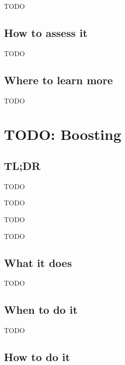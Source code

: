 \documentclass[
]{book}
\providecommand{\tightlist}{%
  \setlength{\itemsep}{0pt}\setlength{\parskip}{0pt}}
\begin{document}
TODO

\hypertarget{how-to-assess-it-16}{%
\section{How to assess it}\label{how-to-assess-it-16}}

TODO

\hypertarget{where-to-learn-more-16}{%
\section{Where to learn more}\label{where-to-learn-more-16}}

TODO

\hypertarget{boosting}{%
\chapter{TODO: Boosting}\label{boosting}}

\hypertarget{tldr-17}{%
\section{TL;DR}\label{tldr-17}}

\begin{description}
\tightlist
\item[What it does]
TODO
\item[When to do it]
TODO
\item[How to do it]
TODO
\item[How to assess it]
TODO
\end{description}

\hypertarget{what-it-does-17}{%
\section{What it does}\label{what-it-does-17}}

TODO

\hypertarget{when-to-do-it-17}{%
\section{When to do it}\label{when-to-do-it-17}}

TODO

\hypertarget{how-to-do-it-17}{%
\section{How to do it}\label{how-to-do-it-17}}
\end{document}
